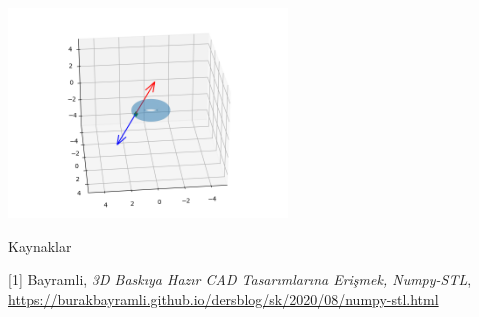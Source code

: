 \documentclass[12pt,fleqn]{article}\usepackage{../../common}
\begin{document}
\includegraphics[width=20em]{phy_005_basics_04_05.png}







Kaynaklar

[1] Bayramli, {\em 3D Baskıya Hazır CAD Tasarımlarına Erişmek, Numpy-STL},
    \url{https://burakbayramli.github.io/dersblog/sk/2020/08/numpy-stl.html}
\end{document}
